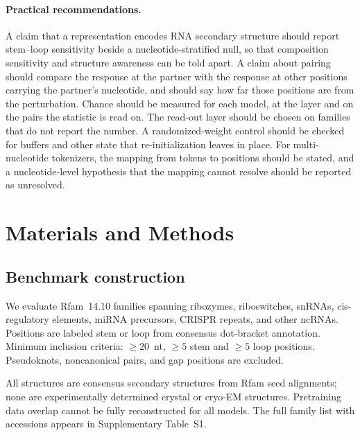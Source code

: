 \documentclass[11pt]{article}
\begin{document}
\paragraph{Practical recommendations.}
A claim that a representation encodes RNA secondary structure should report
stem--loop sensitivity beside a nucleotide-stratified null, so that composition
sensitivity and structure awareness can be told apart. A claim about pairing
should compare the response at the partner with the response at other
positions carrying the partner's nucleotide, and should say how far those
positions are from the perturbation. Chance should be measured for each model,
at the layer and on the pairs the statistic is read on. The read-out layer
should be chosen on families that do not report the number. A randomized-weight
control should be checked for buffers and other state that re-initialization
leaves in place. For multi-nucleotide tokenizers, the mapping from tokens to
positions should be stated, and a nucleotide-level hypothesis that the mapping
cannot resolve should be reported as unresolved.

\section{Materials and Methods}
\label{sec:methods}

\subsection{Benchmark construction}
\label{sec:benchmark}

We evaluate \panelN{} Rfam~14.10 families \citep{kalvari2021rfam} spanning ribozymes, riboswitches, snRNAs,
cis-regulatory elements, miRNA precursors, CRISPR repeats, and other ncRNAs.
Positions are labeled stem or loop from consensus dot-bracket annotation.
Minimum inclusion criteria: $\geq 20$~nt, $\geq 5$ stem and $\geq 5$ loop
positions. Pseudoknots, noncanonical pairs, and gap positions are excluded.

All structures are consensus secondary structures from Rfam seed alignments;
none are experimentally determined crystal or cryo-EM structures. Pretraining
data overlap cannot be fully reconstructed for all models. The full family
list with accessions appears in Supplementary Table~S1.
\end{document}
